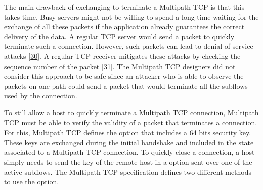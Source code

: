 \documentclass[letterpaper,10pt,english]{sphinxmanual}
\begin{document}
\sphinxAtStartPar
The main drawback of exchanging  to terminate a Multipath TCP is that this takes time. Busy servers might not be willing to spend a long time waiting for the exchange of all these packets if the application already guarantees the correct delivery of the data. A regular TCP server would send a  packet to quickly terminate such a connection. However, such  packets can lead to denial of service attacks {[}\hyperlink{cite.biblio:id5818}{30}{]}. A regular TCP receiver mitigates these attacks by checking the sequence number of the  packet {[}\hyperlink{cite.biblio:id5558}{31}{]}. The Multipath TCP designers did not consider this approach to be safe since an attacker who is able to observe the packets on one path could send a  packet that would terminate all the subflows used by the connection.

\sphinxAtStartPar
To still allow a host to quickly terminate a Multipath TCP connection, Multipath TCP must be able to verify the validity of a packet that terminates a connection. For this, Multipath TCP defines the  option that includes a 64 bits security key. These keys are exchanged during the initial handshake and included in the state associated to a Multipath TCP connection. To quickly close a connection, a host simply needs to send the key of the remote host in a  option sent over one of the active subflows. The Multipath TCP specification defines two different methods to use the  option.
\end{document}
